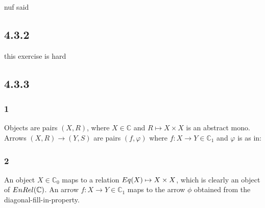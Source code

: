 \documentclass{article}
\begin{document}

nuf said

\subsection*{4.3.2}

this exercise is hard

\subsection*{4.3.3}

\subsubsection*{1}

Objects are pairs $(X,R)$, where $X \in \mathbb C$ and $R \mapsto X \times X$ is an abstract mono.
Arrows $(X,R) \to (Y,S)$ are pairs $(f, \varphi)$ where $f : X \to Y \in \mathbb C_1$ and $\varphi$ is as in:
\begin{center}
\end{center} 

\subsubsection*{2}

An object $X \in \mathbb C_0$ maps to a relation $\mit{Eq}(X) \mapsto X \times X$, which is clearly an object
of $\mit{EnRel}(\mathbb C)$. An arrow $f : X \to Y \in \mathbb C_1$ maps to the arrow $\phi$ obtained from the diagonal-fill-in-property. 

\begin{center}
\end{center} 
\end{document}
